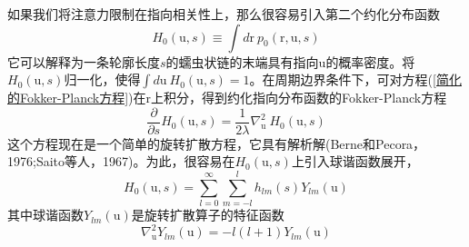 如果我们将注意力限制在指向相关性上，那么很容易引入第二个约化分布函数\\
\begin{equation}
	H_0(\mathrm{u},s)\equiv\int d\mathrm{r}\ p_0(\mathrm{r},\mathrm{u},s)\label{第二个约化分布函数}
\end{equation}
它可以解释为一条轮廓长度$s$的蠕虫状链的末端具有指向$\mathrm{u}$的概率密度。将$H_0(\mathrm{u},s)$归一化，使得$\int d\mathrm{u}\  H_0(\mathrm{u},s)=1$。在周期边界条件下，可对方程(\ref{简化的Fokker-Planck方程})在$\mathrm{r}$上积分，得到约化指向分布函数的Fokker-Planck方程\\
\begin{equation}
	\frac{\partial}{\partial s}H_0(\mathrm{u},s)=\frac{1}{2\lambda}\nabla_\mathrm{u}^2\ H_0(\mathrm{u},s)\label{约化指向分布函数的Fokker-Planck方程}
\end{equation}
这个方程现在是一个简单的旋转扩散方程，它具有解析解(Berne和Pecora，1976;Saito等人，1967)。为此，很容易在$H_0(\mathrm{u},s)$上引入球谐函数展开，\\
\begin{equation}
	H_0(\mathrm{u},s)=\sum_{l=0}^{\infty}\sum_{m=-l}^{l}h_{lm}(s)Y_{lm}(\mathrm{u})\label{球谐函数展开}
\end{equation}
其中球谐函数$Y_{lm}(\mathrm{u})$是旋转扩散算子的特征函数
\begin{equation}
\nabla_\mathrm{u}^2Y_{lm}(\mathrm{u}) =-l(l+1)Y_{lm}(\mathrm{u})
\end{equation}

